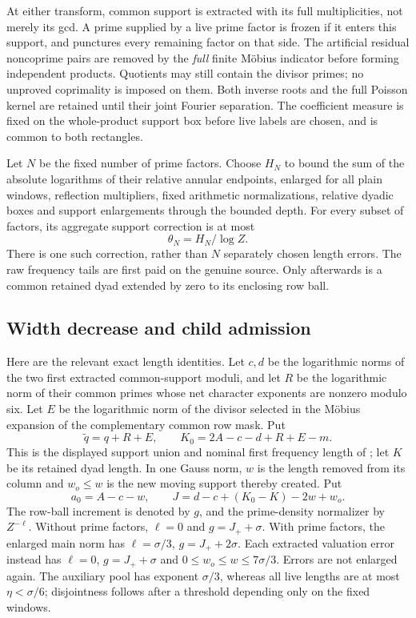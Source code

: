 At either transform, common support is extracted with its full
multiplicities, not merely its gcd. A prime supplied by a live prime
factor is frozen if it enters this support, and punctures every
remaining factor on that side. The artificial residual noncoprime
pairs are removed by the \emph{full} finite M\"obius indicator before
forming independent products. Quotients may still contain the
divisor primes; no unproved coprimality is imposed on them.
Both inverse roots and the full Poisson kernel are retained until
their joint Fourier separation.
The coefficient measure is fixed on the whole-product support box
before live labels are chosen, and is common to both rectangles.

Let $N$ be the fixed number of prime factors. Choose $H_N$ to bound
the sum of the absolute logarithms of their relative annular
endpoints, enlarged for all plain windows, reflection multipliers,
fixed arithmetic normalizations, relative dyadic boxes and support
enlargements through the bounded depth.
For every subset of factors, its aggregate support correction is
at most
\[
 \theta_N=H_N/\log Z .
\]
There is one such correction, rather than $N$ separately chosen
length errors. The raw frequency tails are first paid on the genuine
source. Only afterwards is a common retained dyad extended by zero
to its enclosing row ball.

\subsection{Width decrease and child admission}

Here are the relevant exact length identities. Let $c,d$ be the
logarithmic norms of the two first extracted common-support moduli,
and let $R$ be the logarithmic norm of their common primes whose
net character exponents are nonzero modulo six.
Let $E$ be the logarithmic norm of the divisor selected in the
M\"obius expansion of the complementary common row mask. Put
\[
 \widetilde q=q+R+E,\qquad
 K_0=2A-c-d+R+E-m .
\]
This is the displayed support union and nominal first frequency
length of \cite[(18.22)]{OAI26}; let $K$ be its retained dyad length.
In one Gauss norm, $w$ is the length removed from its column and
$w_o\le w$ is the new moving support thereby created. Put
\[
 a_0=A-c-w,\qquad J=d-c+(K_0-K)-2w+w_o .
\]
The row-ball increment is denoted by $g$, and the prime-density
normalizer by $Z^{-\ell}$. Without prime factors,
$\ell=0$ and $g=J_++\sigma$.
With prime factors, the enlarged main norm has
$\ell=\sigma/3$, $g=J_++2\sigma$.
Each extracted valuation error instead has
$\ell=0$, $g=J_++\sigma$ and
$0\le w_o\le w\le7\sigma/3$. Errors are not enlarged again.
The auxiliary pool has exponent $\sigma/3$, whereas all live
lengths are at most $\eta<\sigma/6$; disjointness follows after a
threshold depending only on the fixed windows.

